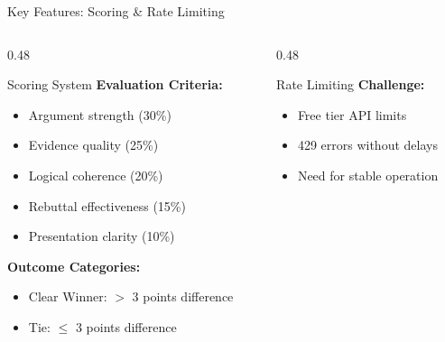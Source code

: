 \documentclass[aspectratio=169]{beamer}
\begin{document}
\begin{frame}{Key Features: Scoring \& Rate Limiting}
    \begin{columns}
        \begin{column}{0.48\textwidth}
            \begin{block}{Scoring System}
                \small
                \textbf{Evaluation Criteria:}
                \begin{itemize}
                    \footnotesize
                    \item Argument strength (30\%)
                    \item Evidence quality (25\%)
                    \item Logical coherence (20\%)
                    \item Rebuttal effectiveness (15\%)
                    \item Presentation clarity (10\%)
                \end{itemize}
                
                \vspace{0.2cm}
                
                \textbf{Outcome Categories:}
                \begin{itemize}
                    \footnotesize
                    \item Clear Winner: $>$ 3 points difference
                    \item Tie: $\leq$ 3 points difference
                \end{itemize}
            \end{block}
        \end{column}
        
        \begin{column}{0.48\textwidth}
            \begin{block}{Rate Limiting}
                \small
                \textbf{Challenge:}
                \begin{itemize}
                    \footnotesize
                    \item Free tier API limits
                    \item 429 errors without delays
                    \item Need for stable operation
                \end{itemize}
                
                \vspace{0.2cm}
                

\end{block}
\end{column}
\end{columns}
\end{frame}
\end{document}
